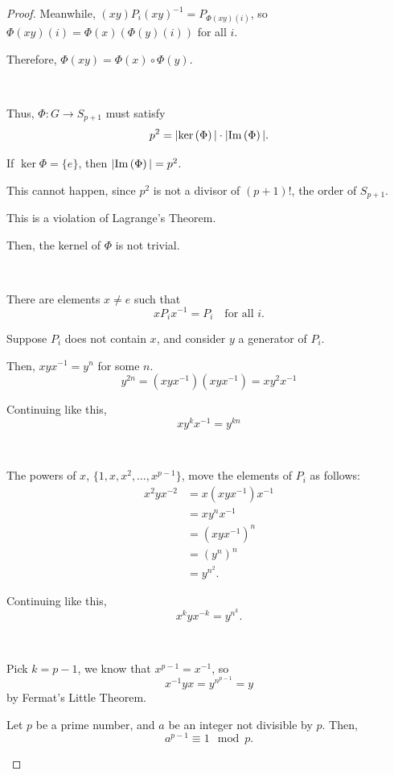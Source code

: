 \begin{proof}
    Meanwhile, $(xy) P_i (xy)^{-1} = P_{\Phi(xy)(i)}$, so $\Phi(xy)(i) = \Phi(x)(\Phi(y)(i))$ for all $i$.

    Therefore, $\Phi(xy) = \Phi(x) \circ \Phi(y)$.

    {~~~}

    Thus, $\Phi: G \to S_{p+1}$ must satisfy \vspace{-1em} \[ 
        p^2 = | \mathrm{ker}\left( \Phi \right) | \cdot | \mathrm{Im}\left( \Phi \right) |.
    \]

    If $\ker{\Phi} = \{ e \}$, then $| \mathrm{Im}\left( \Phi \right) | = p^2$.

    This cannot happen, since $p^2$ is not a divisor of $(p+1)!$, the order of $S_{p+1}$.

    This is a violation of Lagrange's Theorem.

    Then, the kernel of $\Phi$ is not trivial.

    {~~~}

    There are elements $x \neq e$ such that \[
        x P_i x^{-1} = P_i \quad \text{for all } i.
    \]

    Suppose $P_i$ does not contain $x$, and consider $y$ a generator of $P_i$. 

    Then, $x y x^{-1} = y^n$ for some $n$. \[
        y^{2n} = (x y x^{-1}) (x y x^{-1}) = x y^2 x^{-1}
    \] 

    Continuing like this, \[
        x y^k x^{-1} = y^{kn}
    \]

    {~~~}

    The powers of $x$, $\{ 1, x, x^2, \dots, x^{p-1} \}$, move the elements of $P_i$ as follows:
    \begin{align*}
        x^2 y x^{-2} & = x (x y x^{-1}) x^{-1} \\
                     & = x y^n x^{-1}          \\
                     & = (x y x^{-1})^n        \\
                     & = (y^n)^n               \\
                     & = y^{n^2}.
    \end{align*}

    Continuing like this, \[
        x^k y x^{-k} = y^{n^k}.
    \]

    {~~~}

    Pick $k = p-1$, we know that $x^{p-1} = x^{-1}$, so \[
        x^{-1} y x = y^{n^{p-1}} = y
    \] by Fermat's Little Theorem.

    \begin{theorem}
        Let $p$ be a prime number, and $a$ be an integer not divisible by $p$. Then, \[
            a^{p-1} \equiv 1 \mod{p}.
        \]
    \end{theorem}


\end{proof}
